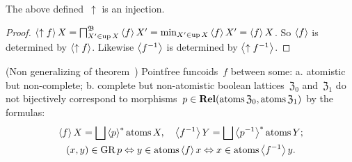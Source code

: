 \begin{prop}
The above defined~$\uparrow$ is an injection.
\end{prop}

\begin{proof}
$\left\langle \uparrow f\right\rangle X = \bigsqcap^{\mathfrak{B}}_{X'\in\operatorname{up} X} \left\langle f\right\rangle X' = \min_{X'\in\operatorname{up} X} \left\langle f\right\rangle X' = \left\langle f\right\rangle X$.
So $\left\langle f\right\rangle$ is determined by $\left\langle \uparrow f\right\rangle$. Likewise $\left\langle f^{-1}\right\rangle$ is determined by $\left\langle \uparrow f^{-1}\right\rangle$.
\end{proof}

\begin{conjecture}
(Non generalizing of theorem~)
Pointfree funcoids~$f$ between some: a. atomistic but non-complete; b. complete but non-atomistic boolean lattices~$\mathfrak{Z}_0$ and~$\mathfrak{Z}_1$
do not bijectively correspond to morphisms~$p\in\mathbf{Rel}(\operatorname{atoms}\mathfrak{Z}_0,\operatorname{atoms}\mathfrak{Z}_1)$ by the formulas:
\begin{gather*}
\supfun{f}X = \bigsqcup\rsupfun{p}\atoms X, \quad
\supfun{f^{-1}}Y = \bigsqcup\rsupfun{p^{-1}}\atoms Y; \\
(x,y)\in\GR p \Leftrightarrow y\in\atoms\supfun{f}x \Leftrightarrow x\in\atoms\supfun{f^{-1}}y.
\end{gather*}
\end{conjecture}
